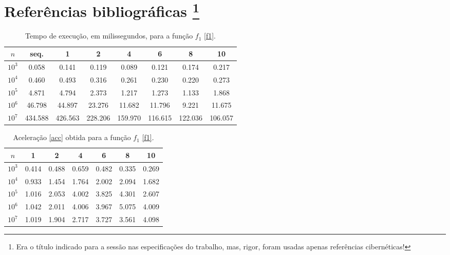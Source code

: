 \documentclass{article}
\begin{document}
  \section{Referências bibliográficas \protect\footnote{Era o título indicado para a sessão nas especificações do trabalho, mas,  rigor, foram usadas apenas referências cibernéticas!}} \label{bibl}

  \printbibliography[heading=none]

  \newpage

  \begin{table}
    \centering
    \begin{tabular}{||c c c c c c c c||}
      \hline
      $n$ & seq. & 1 & 2 & 4 & 6 & 8 & 10 \\ 
      \hline \hline
      $10^{3}$ & 0.058 & 0.141 & 0.119 & 0.089 & 0.121 & 0.174 & 0.217 \\ 
      \hline 
      $10^{4}$ & 0.460 & 0.493 & 0.316 & 0.261 & 0.230 & 0.220 & 0.273 \\ 
      \hline 
      $10^{5}$ & 4.871 & 4.794 & 2.373 & 1.217 & 1.273 & 1.133 & 1.868 \\ 
      \hline 
      $10^{6}$ & 46.798 & 44.897 & 23.276 & 11.682 & 11.796 & 9.221 & 11.675 \\ 
      \hline 
      $10^{7}$ & 434.588 & 426.563 & 228.206 & 159.970 & 116.615 & 122.036 & 106.057 \\ 
      \hline 
    \end{tabular}
    \caption{Tempo de execução, em milissegundos, para a função $f_1$ \eqref{f1}.}
    \label{f1t}
  \end{table}

    \begin{table}
      \centering
      \begin{tabular}{||c c c c c c c||}
        \hline
        $n$ & 1 & 2 & 4 & 6 & 8 & 10 \\ 
        \hline \hline
        $10^{3}$ & 0.414 & 0.488 & 0.659 & 0.482 & 0.335 & 0.269 \\ 
        \hline 
        $10^{4}$ & 0.933 & 1.454 & 1.764 & 2.002 & 2.094 & 1.682 \\ 
        \hline 
        $10^{5}$ & 1.016 & 2.053 & 4.002 & 3.825 & 4.301 & 2.607 \\ 
        \hline 
        $10^{6}$ & 1.042 & 2.011 & 4.006 & 3.967 & 5.075 & 4.009 \\ 
        \hline 
        $10^{7}$ & 1.019 & 1.904 & 2.717 & 3.727 & 3.561 & 4.098 \\ 
        \hline 
      \end{tabular}
      \caption{Aceleração \eqref{acc} obtida para a função $f_1$ \eqref{f1}. }
      \label{f1a}
    \end{table}
\end{document}
